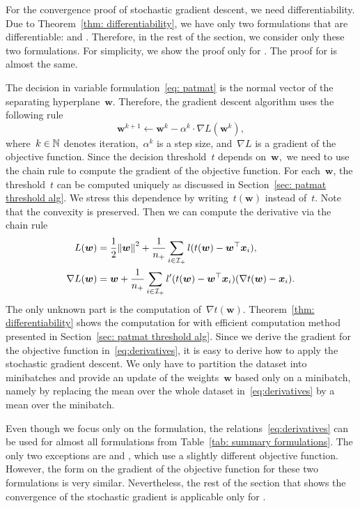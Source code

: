 For the convergence proof of stochastic gradient descent, we need differentiability. Due to Theorem~\ref{thm: differentiability}, we have only two formulations that are differentiable: \PatMat and \PatMatNP. Therefore, in the rest of the section, we consider only these two formulations. For simplicity, we show the proof only for \PatMat. The proof for \PatMatNP is almost the same.

The decision in variable \PatMat formulation~\eqref{eq: patmat} is the normal vector of the separating hyperplane~$\bm{w}.$ Therefore, the gradient descent algorithm uses the following rule
\begin{equation*}
  \bm{w}^{k+1} \gets \bm{w}^k - \alpha^k \cdot \nabla L(\bm{w}^k),
\end{equation*}
where~$k \in \mathbb{N}$ denotes iteration,~$\alpha^k$ is a step size, and~$\nabla L$ is a gradient of the objective function. Since the decision threshold~$t$ depends on~$\bm{w},$ we need to use the chain rule to compute the gradient of the objective function. For each~$\bm{w}$, the threshold~$t$ can be computed uniquely as discussed in Section~\ref{sec: patmat threshold alg}. We stress this dependence by writing~$t(\bm{w})$ instead of~$t$. Note that the convexity is preserved. Then we can compute the derivative via the chain rule
\begin{equation}\label{eq:derivatives}
  \begin{aligned}
  L(\bm{w})
    & = \frac{1}{2}\norm{\bm{w}}^2 + \frac{1}{\npos} \sum_{i \in \Ipos} l(t(\bm{w}) - \bm{w}^{\top} \bm{x}_i) , \\
  \nabla L(\bm{w})
    & = \bm{w} + \frac{1}{\npos} \sum_{i \in \Ipos} l'(t(\bm{w}) - \bm{w}^{\top} \bm{x}_i)(\nabla t(\bm{w}) - \bm{x}_i).
  \end{aligned}
\end{equation}
The only unknown part is the computation of~$\nabla t(\bm{w})$. Theorem~\ref{thm: differentiability} shows the computation for \PatMat with efficient computation method presented in Section~\ref{sec: patmat threshold alg}. Since we derive the gradient for the objective function in~\eqref{eq:derivatives}, it is easy to derive how to apply the stochastic gradient descent. We only have to partition the dataset into minibatches and provide an update of the weights~$\bm{w}$ based only on a minibatch, namely by replacing the mean over the whole dataset in~\eqref{eq:derivatives} by a mean over the minibatch. 

Even though we focus only on the \PatMat formulation, the relations~\eqref{eq:derivatives} can be used for almost all formulations from Table~\ref{tab: summary formulations}. The only two exceptions are \Grill and \GrillNP, which use a slightly different objective function. However, the form on the gradient of the objective function for these two formulations is very similar. Nevertheless, the rest of the section that shows the convergence of the stochastic gradient is applicable only for \PatMat.

